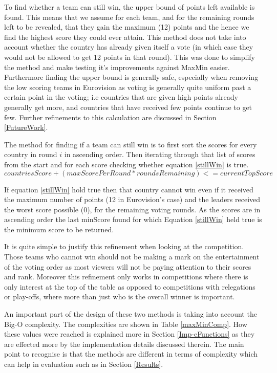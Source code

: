 \documentclass[12pt]{report}
\begin{document}
To find whether a team can still win, the upper bound of points left available is found. This means that we assume for each team, and for the remaining rounds left to be revealed, that they gain the maximum (12) points and the hence we find the highest score they could ever attain. This method does not take into account whether the country has already given itself a vote (in which case they would not be allowed to get 12 points in that round). This was done to simplify the method and make testing it's improvements against MaxMin easier. Furthermore finding the upper bound is generally safe, especially when removing the low scoring teams in Eurovision as voting is generally quite uniform past a certain point in the voting; i.e countries that are given high points already generally get more, and countries that have received few points continue to get few. Further refinements to this calculation are discussed in Section \ref{FutureWork}.

The method for finding if a team can still win is to first sort the scores for every country in round $i$ in ascending order. Then iterating through that list of scores from the start and for each score checking whether equation \ref{stillWin} is true.
\begin{equation}\label{stillWin}
	countriesScore + (maxScorePerRound * roundsRemaining) <= currentTopScore
\end{equation}

If equation \ref{stillWin} hold true then that country cannot win even if it received the maximum number of points (12 in Eurovision's case) and the leaders received the worst score possible (0), for the remaining voting rounds. As the scores are in ascending order the last minScore found for which Equation \ref{stillWin} held true is the minimum score to be returned.

It is quite simple to justify this refinement when looking at the competition. Those teams who cannot win should not be making a mark on the entertainment of the voting order as most viewers will not be paying attention to their scores and rank. Moreover this refinement only works in competitions where there is only interest at the top of the table as opposed to competitions with relegations or play-offs, where more than just who is the overall winner is important.

An important part of the design of these two methods is taking into account the Big-O complexity. The complexities are shown in Table \ref{maxMinComp}. How these values were reached is explained more in Section \ref{Imp-eFunctions} as they are effected more by the implementation details discussed therein. The main point to recognise is that the methods are different in terms of complexity which can help in evaluation such as in Section \ref{Results}.
\end{document}
